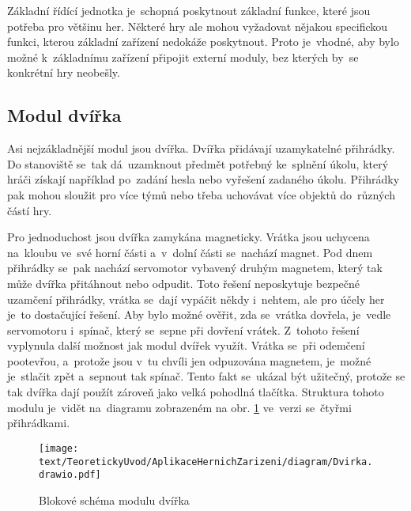 Základní řídící jednotka je~schopná poskytnout základní funkce, které jsou potřeba pro většinu her.
Některé hry ale mohou vyžadovat nějakou specifickou funkci, kterou základní zařízení nedokáže poskytnout.
Proto je~vhodné, aby bylo možné k~základnímu zařízení připojit externí moduly, bez kterých by~se konkrétní hry neobešly.

\subsection{Modul dvířka}
Asi nejzákladnější modul jsou dvířka.
Dvířka přidávají uzamykatelné přihrádky.
Do stanoviště se~tak dá~uzamknout předmět potřebný ke~splnění úkolu, který hráči získají například po~zadání hesla nebo vyřešení zadaného úkolu.
Přihrádky pak mohou sloužit pro více týmů nebo třeba uchovávat více objektů do~různých částí hry.

Pro jednoduchost jsou dvířka zamykána magneticky.
Vrátka jsou uchycena \\ na~kloubu ve~své horní části a~v~dolní části se~nachází magnet.
Pod dnem přihrádky se~pak nachází servomotor vybavený druhým magnetem, který tak může dvířka přitáhnout nebo odpudit.
Toto řešení neposkytuje bezpečné uzamčení přihrádky, vrátka se~dají vypáčit někdy i~nehtem, ale pro účely her je~to dostačující řešení.
Aby bylo možné ověřit, zda se~vrátka dovřela, je~vedle servomotoru i~spínač, který se~sepne při dovření vrátek.
Z~tohoto řešení vyplynula další možnost jak modul dvířek využít.
Vrátka se~při odemčení pootevřou, a~protože jsou v~tu chvíli jen odpuzována magnetem, je~možné je~stlačit zpět a~sepnout tak spínač.
Tento fakt se~ukázal být užitečný, protože se tak dvířka dají použít zároveň jako velká pohodlná tlačítka.
Struktura tohoto modulu je~vidět na~diagramu zobrazeném na obr. \ref{fig:diagram_dvirka} ve~verzi se~čtyřmi přihrádkami.

\begin{figure}[h]
    \centering
    \texttt{[image: text/TeoretickyUvod/AplikaceHernichZarizeni/diagram/Dvirka.drawio.pdf]}
    \caption{Blokové schéma modulu dvířka}
    \label{fig:diagram_dvirka}
\end{figure}
 
